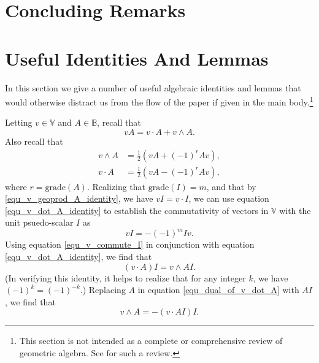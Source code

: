 \documentclass{birkjour}
\theoremstyle{definition}
\theoremstyle{remark}
\numberwithin{equation}{section}
\newcommand{\B}{\mathbb{B}}
\newcommand{\V}{\mathbb{V}}
\newcommand{\grade}{\mbox{grade}}
\begin{document}

\section{Concluding Remarks}


\section{Useful Identities And Lemmas}\label{sec_useful_identities}

In this section we give a number of useful algebraic identities and lemmas that would
otherwise distract us from the flow of the paper if given in the main body.\footnote{This
section is not intended as a complete or comprehensive review of geometric algebra.
See \cite{} for such a review.}

Letting $v\in\V$ and $A\in\B$, recall that
\begin{equation}\label{equ_v_geoprod_A_identity}
vA = v\cdot A+v\wedge A.
\end{equation}
Also recall that
\begin{align}
v\wedge A &= \frac{1}{2}(vA+(-1)^rAv),\label{equ_v_wedge_A_identity} \\
v\cdot A &= \frac{1}{2}(vA-(-1)^rAv),\label{equ_v_dot_A_identity}
\end{align}
where $r=\grade(A)$.
Realizing that $\grade(I)=m$, and that by \eqref{equ_v_geoprod_A_identity}, we have $vI=v\cdot I$, we can use
equation \eqref{equ_v_dot_A_identity} to establish the commutativity of vectors in $\V$ with the unit psuedo-scalar $I$ as
\begin{equation}\label{equ_v_commute_I}
vI = -(-1)^mIv.
\end{equation}
Using equation \eqref{equ_v_commute_I} in conjunction with equation \eqref{equ_v_dot_A_identity}, we find that
\begin{equation}\label{equ_dual_of_v_dot_A}
(v\cdot A)I = v\wedge AI.
\end{equation}
(In verifying this identity, it helps to realize that for any integer $k$, we have $(-1)^k=(-1)^{-k}$.)
Replacing $A$ in equation \eqref{equ_dual_of_v_dot_A} with $AI$, we find that
\begin{equation}\label{equ_dual_of_v_dot_dual_A}
v\wedge A = -(v\cdot AI)I.
\end{equation}
\end{document}
